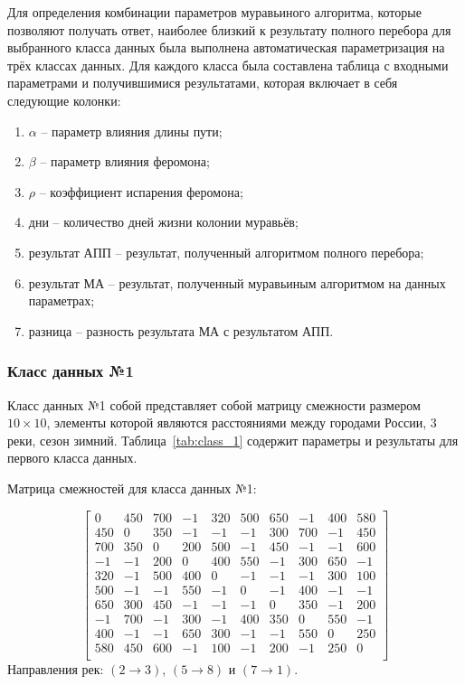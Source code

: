 \hspace{1.25cm}
Для определения комбинации параметров муравьиного алгоритма, которые позволяют получать ответ, наиболее близкий к результату полного перебора для выбранного класса данных была выполнена автоматическая параметризация на трёх классах данных. Для каждого класса была составлена таблица с входными параметрами и получившимися результатами, которая включает в себя следующие колонки:

\begin{enumerate}[label=\arabic*)]
    \item $\alpha$ -- параметр влияния длины пути;
    \item $\beta$ -- параметр влияния феромона;
    \item $\rho$ -- коэффициент испарения феромона;
    \item дни -- количество дней жизни колонии муравьёв;
    \item результат АПП -- результат, полученный алгоритмом полного перебора;
    \item результат МА -- результат, полученный муравьиным алгоритмом на данных параметрах;
    \item разница -- разность результата МА с результатом АПП.
\end{enumerate}

\subsubsection{Класс данных №1}

\hspace{1.25cm}
Класс данных №1 собой представляет собой матрицу смежности размером $10 \times 10$, элементы которой являются расстояниями между городами России, 3 реки, сезон зимний. Таблица~\ref{tab:class_1} содержит параметры и результаты для первого класса данных.

Матрица смежностей для класса данных №1:

\begin{equation*}
\begin{bmatrix}
0  &  450 & 700 & -1 &  320 & 500 & 650 & -1 &  400 & 580 \\
450 & 0  &  350 & -1 &  -1 &  -1 &  300 & 700 & -1 &  450 \\
700 & 350 & 0  &  200 & 500 & -1 &  450 & -1 &  -1 &  600 \\
-1 &  -1 &  200 & 0  &  400 & 550 & -1 &  300 & 650 & -1 \\
320 & -1 &  500 & 400 & 0  &  -1 &  -1  & -1 &  300 & 100 \\
500 & -1 &  -1 &  550 & -1 &  0  &  -1  & 400 & -1 &  -1 \\
650 & 300 & 450 & -1  & -1  & -1 &  0  &  350 & -1  & 200 \\
-1 &  700 & -1 &  300 & -1 &  400 & 350 & 0  &  550 & -1 \\
400 & -1  & -1  & 650 & 300 & -1 &  -1 &  550 & 0  &  250 \\
580 & 450 & 600 & -1 &  100 & -1 &  200 & -1 &  250 & 0 \\
\end{bmatrix}
\end{equation*}
Направления рек: $(2 \to 3)$, $(5 \to 8)$ и $(7 \to 1)$.

